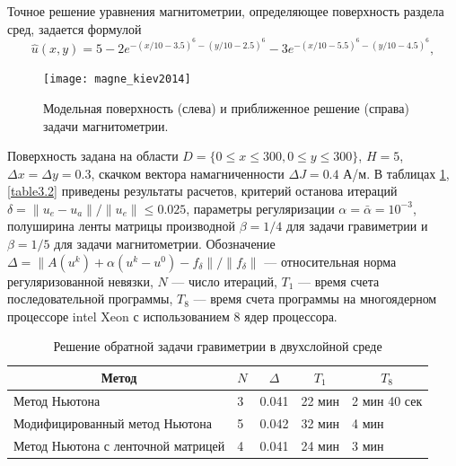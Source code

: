 Точное решение уравнения магнитометрии, определяющее поверхность раздела сред, задается формулой
$$\hat{u}(x,y)=5-2e^{-(x/10-3.5)^6-(y/10-2.5)^6}-3e^{-(x/10-5.5)^6-(y/10-4.5)^6},$$
\begin{figure}
	\centering
	\texttt{[image: magne\_kiev2014]}
	\caption{Модельная поверхность (слева) и приближенное решение (справа) задачи магнитометрии.}
	\label{fig:magne_kiev2014}
\end{figure}
Поверхность задана на области $D=\{0\le x\le 300, 0\le y\le 300\}$, $H=5$, $\Delta x=\Delta y=0.3$, скачком вектора намагниченности $\Delta J=0.4$ А/м. В таблицах \ref{table3.1}, \ref{table3.2} приведены результаты расчетов, критерий останова итераций 
$\delta=\|u_e-u_a\|/\|u_e\|\le 0.025$, параметры регуляризации $\alpha=\bar{\alpha}=10^{-3}$, полуширина ленты матрицы производной $\beta=1/4$ для задачи гравиметрии и $\beta=1/5$ для задачи магнитометрии. Обозначение $\Delta=\|A(u^k)+\alpha(u^k-u^0)-f_\delta\|/\|f_\delta\|$ --- относительная норма регуляризованной невязки, $N$ --- число итераций, $T_1$ --- время счета последовательной программы, $T_8$ --- время счета программы на многоядерном процессоре intel Xeon с использованием 8 ядер процессора.
\begin{table}[]
	\centering
	\caption{Решение обратной задачи гравиметрии в двухслойной среде}
	\label{table3.1}
	\begin{tabular}{|p{}|p{}|l|l|l|}
		\hline
		\multicolumn{1}{|c|}{Метод}        & \multicolumn{1}{c|}{$N$} &
		\multicolumn{1}{c|}{$\Delta$} & \multicolumn{1}{c|}{$T_1$} & \multicolumn{1}{c|}{$T_8$} \\ \hline
		Метод Ньютона                      &  3        & 0.041                          &       22 мин                  &     2 мин 40 сек                 \\ \hline
		Модифицированный метод Ньютона     &         5           & 0.042            & 32 мин                  & 4 мин                   \\ \hline
		Метод Ньютона с ленточной матрицей &  4               & 0.041                    & 24 мин                  & 3 мин                   \\ \hline
	\end{tabular}
\end{table}
